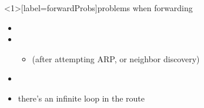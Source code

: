 \begin{frame}<1>[label=forwardProbs]{problems when forwarding}
    \begin{itemize}
    \item {}
    \item {}
        \begin{itemize}
        \item (after attempting ARP, or neighbor discovery)
        \end{itemize}
    \item {}
    \item there's an infinite loop in the route
    \end{itemize}
\end{frame}
